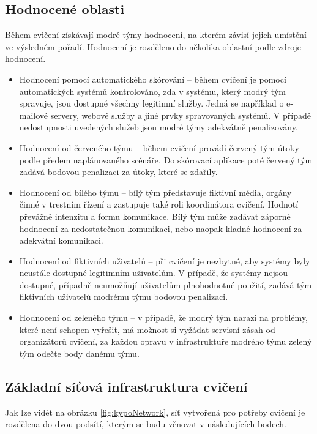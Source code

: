 \documentclass[
  digital,
  twoside,
  table, 
  nolof, 
  nolot
]{fithesis3}
\begin{document}
\subsection{Hodnocené oblasti}
Během cvičení získávají modré týmy hodnocení, na kterém závisí jejich umístění ve výsledném pořadí. Hodnocení je rozděleno do několika oblastní podle zdroje hodnocení.

\begin{itemize}
\item Hodnocení pomocí automatického skórování -- během cvičení je pomocí automatických systémů kontrolováno, zda v systému, který modrý tým spravuje, jsou dostupné všechny legitimní služby. Jedná se například o e-mailové servery, webové služby a jiné prvky spravovaných systémů. V případě nedostupnosti uvedených služeb jsou modré týmy adekvátně penalizovány.
\item Hodnocení od červeného týmu -- během cvičení provádí červený tým útoky podle předem naplánovaného scénáře. Do skórovací aplikace poté červený tým zadává bodovou penalizaci za útoky, které se zdařily.
\item Hodnocení od bílého týmu -- bílý tým představuje fiktivní média, orgány činné v trestním řízení a zastupuje také roli koordinátora cvičení. Hodnotí převážně intenzitu a formu komunikace. Bílý tým může zadávat záporné hodnocení za nedostatečnou komunikaci, nebo naopak kladné hodnocení za adekvátní komunikaci.
\item Hodnocení od fiktivních uživatelů -- při cvičení je nezbytné, aby systémy byly neustále dostupné legitimním uživatelům. V případě, že systémy nejsou dostupné, případně neumožňují uživatelům plnohodnotné použití, zadává tým fiktivních uživatelů modrému týmu bodovou penalizaci.
\item Hodnocení od zeleného týmu -- v případě, že modrý tým narazí na problémy, které není schopen vyřešit, má možnost si vyžádat servisní zásah od organizátorů cvičení, za každou opravu v infrastruktuře modrého týmu zelený tým odečte body danému týmu.
\end{itemize}

\subsection{Základní síťová infrastruktura cvičení}
Jak lze vidět na obrázku \ref{fig:kypoNetwork}, síť vytvořená pro potřeby cvičení je rozdělena do dvou podsítí, kterým se budu věnovat v následujících bodech.
\end{document}
